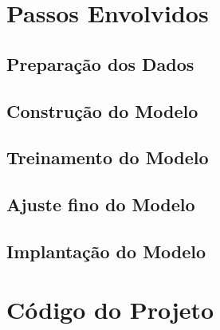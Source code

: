 \documentclass{article}
\begin{document}
        

    \section{Passos Envolvidos}

    \subsection{Preparação dos Dados}

    \subsection{Construção do Modelo}

    \subsection{Treinamento do Modelo}

    \subsection{Ajuste fino do Modelo}

    \subsection{Implantação do Modelo}

    \section{Código do Projeto}
\end{document}
